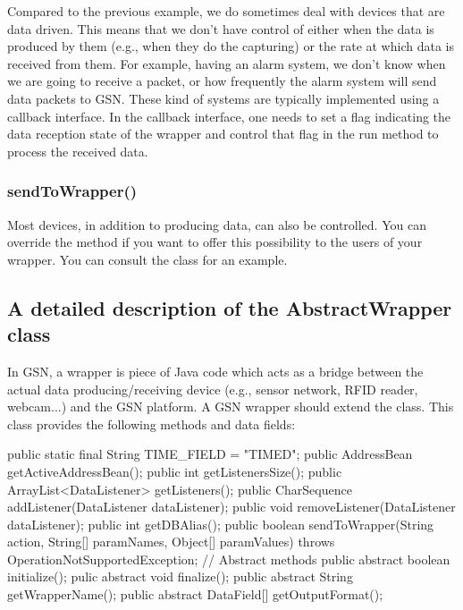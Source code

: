 Compared to the previous example, we do sometimes deal with devices that are
data driven. This means that we don't have control of either when the data is
produced by them (e.g., when they do the capturing) or the rate at which
data is received from them.
For example, having an alarm system, we don't know when we
are going to receive a packet, or how frequently the alarm system will send
data packets to GSN. These kind of systems are typically implemented using a
callback interface. In the callback interface, one needs to set a flag indicating
the data reception state of the wrapper and control that flag in the run method
to process the received data.

\subsubsection{sendToWrapper()}
Most devices, in addition to producing data, can also be controlled. You can
override the method
if you want to offer this possibility to the users of your wrapper.
You can consult the  class for an
example.

\subsection{A detailed description of the AbstractWrapper class}
In GSN, a wrapper is piece of Java code which acts as a bridge between the actual
data producing/receiving device (e.g., sensor network, RFID reader, webcam...)
and the GSN platform. A GSN wrapper should extend the 
class. This class provides the following methods and data fields:

\begin{javacode}
	public static final String TIME_FIELD = "TIMED";
	public AddressBean getActiveAddressBean();
	public int getListenersSize();
	public ArrayList<DataListener> getListeners();
	public CharSequence addListener(DataListener dataListener);
	public void removeListener(DataListener dataListener);
	public int getDBAlias();
	public boolean sendToWrapper(String action,
		String[] paramNames, Object[] paramValues)
			throws OperationNotSupportedException;
	// Abstract methods
	public abstract boolean initialize();
	pulic abstract void finalize();
	public abstract String getWrapperName();
	public abstract DataField[] getOutputFormat();
\end{javacode}

